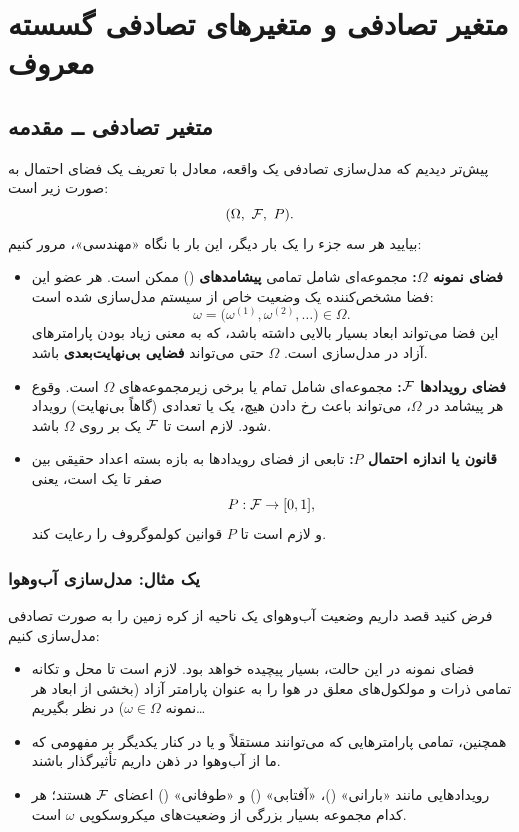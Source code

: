 \chapter{متغیر تصادفی و متغیرهای تصادفی گسسته معروف}

\section{متغیر تصادفی  ــ مقدمه}

پیش‌تر دیدیم که مدل‌سازی تصادفی یک واقعه، معادل با تعریف یک فضای احتمال به صورت زیر است:
\[
(\Omega,\ \F,\ P).
\]
بیایید هر سه جزء را یک بار دیگر، این بار با نگاه «مهندسی»، مرور کنیم:

\begin{itemize}
\item \textbf{فضای نمونه $\Omega$:} مجموعه‌ای شامل تمامی \textbf{پیشامدهای} () ممکن است. هر عضو این فضا مشخص‌کننده یک وضعیت خاص از سیستم مدل‌سازی شده است:
\[\omega=\big(\omega^{(1)},\omega^{(2)},\ldots\big)\in\Omega .\]
این فضا می‌تواند ابعاد بسیار بالایی داشته باشد، که به معنی زیاد بودن پارامترهای آزاد در مدل‌سازی است. $\Omega$ حتی می‌تواند \textbf{فضایی بی‌نهایت‌بعدی} باشد.
\item \textbf{فضای رویدادها $\mathcal{F}$:} مجموعه‌ای شامل تمام یا برخی زیرمجموعه‌های $\Omega$ است. وقوع هر پیشامد در $\Omega$، می‌تواند باعث رخ دادن هیچ، یک یا تعدادی (گاهاً بی‌نهایت) رویداد شود. لازم است تا $\mathcal{F}$ یک  بر روی $\Omega$ باشد.
\item \textbf{قانون یا اندازه احتمال $P$:} تابعی از فضای رویدادها به بازه بسته اعداد حقیقی بین صفر تا یک است، یعنی
\[P:\mathcal{F}\to[0,1],\]
و لازم است تا $P$ قوانین کولموگروف  را رعایت کند.
\end{itemize}

\subsection{یک مثال: مدل‌سازی آب‌وهوا}
فرض کنید قصد داریم وضعیت آب‌وهوای یک ناحیه از کره زمین را به صورت تصادفی مدل‌سازی کنیم:
\begin{itemize}
\item فضای نمونه در این حالت، بسیار پیچیده خواهد بود. لازم است تا محل و تکانه تمامی ذرات و مولکول‌های معلق در هوا را به عنوان پارامتر آزاد (بخشی از ابعاد هر نمونه $\omega\in\Omega$) در نظر بگیریم\ldots
\item همچنین، تمامی پارامترهایی که می‌توانند مستقلاً و یا در کنار یکدیگر بر مفهومی که ما از آب‌وهوا در ذهن داریم تأثیرگذار باشند.
\item رویدادهایی مانند «بارانی» ()، «آفتابی» () و «طوفانی» () اعضای $\mathcal{F}$ هستند؛ هر کدام مجموعه بسیار بزرگی از وضعیت‌های میکروسکوپی $\omega$ است.
\end{itemize}

